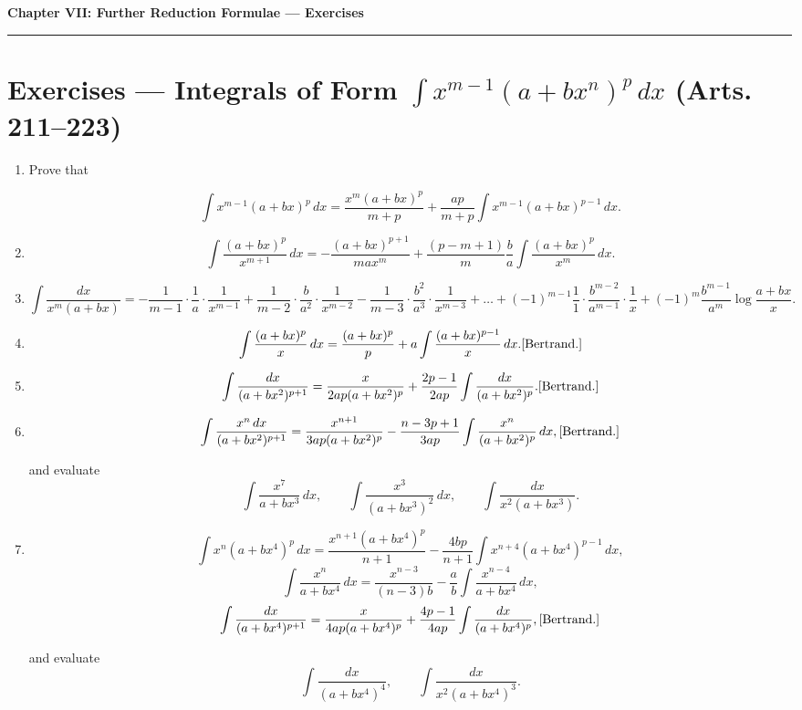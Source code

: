 \documentclass[11pt, a4paper]{article}
\newcommand{\source}[1]{\hfill\textnormal{[#1]}}
\begin{document}
\begin{center}
    {\LARGE \bfseries \color{accent} Chapter VII: Further Reduction Formulae --- Exercises}\\
    \vspace{0.2cm}
    {\color{accent}\rule{0.55\linewidth}{0.8pt}}
\end{center}
\vspace{0.35cm}

\section*{Exercises --- Integrals of Form $\displaystyle\int x^{m-1}(a+bx^n)^p\,dx$ (Arts. 211--223)}

\begin{enumerate}[leftmargin=2em]

\item Prove that

\[
\int x^{m-1}(a+bx)^p\,dx=\dfrac{x^m(a+bx)^p}{m+p}+\dfrac{ap}{m+p}\int x^{m-1}(a+bx)^{p-1}\,dx.
\]

\item
\[
\int \dfrac{(a+bx)^p}{x^{m+1}}\,dx=-\dfrac{(a+bx)^{p+1}}{max^m}+\dfrac{(p-m+1)}{m}\dfrac{b}{a}\int \dfrac{(a+bx)^p}{x^m}\,dx.
\]

\item
\[
\int \dfrac{dx}{x^m(a+bx)}=-\dfrac{1}{m-1}\cdot\dfrac1a\cdot\dfrac{1}{x^{m-1}}+\dfrac{1}{m-2}\cdot\dfrac{b}{a^2}\cdot\dfrac{1}{x^{m-2}}-\dfrac{1}{m-3}\cdot\dfrac{b^2}{a^3}\cdot\dfrac{1}{x^{m-3}}
+\dots+(-1)^{m-1}\dfrac{1}{1}\cdot\dfrac{b^{m-2}}{a^{m-1}}\cdot\dfrac1x+(-1)^m\dfrac{b^{m-1}}{a^m}\log\dfrac{a+bx}{x}.
\]

\item
\[
\int \dfrac{(a+bx)^p}{x}\,dx=\dfrac{(a+bx)^p}{p}+a\int \dfrac{(a+bx)^{p-1}}{x}\,dx. \source{Bertrand.}
\]

\item
\[
\int \dfrac{dx}{(a+bx^2)^{p+1}}=\dfrac{x}{2ap(a+bx^2)^p}+\dfrac{2p-1}{2ap}\int \dfrac{dx}{(a+bx^2)^p}. \source{Bertrand.}
\]

\item
\[
\int \dfrac{x^n\,dx}{(a+bx^2)^{p+1}}=\dfrac{x^{n+1}}{3ap(a+bx^2)^p}-\dfrac{n-3p+1}{3ap}\int \dfrac{x^n}{(a+bx^2)^p}\,dx, \source{Bertrand.}
\]

and evaluate
\[
\int \dfrac{x^7}{a+bx^3}\,dx, \qquad \int \dfrac{x^3}{(a+bx^3)^2}\,dx, \qquad \int \dfrac{dx}{x^2(a+bx^3)}.
\]

\item
\[
\int x^n(a+bx^4)^p\,dx=\dfrac{x^{n+1}(a+bx^4)^p}{n+1}-\dfrac{4bp}{n+1}\int x^{n+4}(a+bx^4)^{p-1}\,dx,
\]
\[
\int \dfrac{x^n}{a+bx^4}\,dx=\dfrac{x^{n-3}}{(n-3)b}-\dfrac{a}{b}\int \dfrac{x^{n-4}}{a+bx^4}\,dx,
\]
\[
\int \dfrac{dx}{(a+bx^4)^{p+1}}=\dfrac{x}{4ap(a+bx^4)^p}+\dfrac{4p-1}{4ap}\int \dfrac{dx}{(a+bx^4)^p}, \source{Bertrand.}
\]

and evaluate
\[
\int \dfrac{dx}{(a+bx^4)^4}, \qquad \int \dfrac{dx}{x^2(a+bx^4)^3}.
\]

\end{enumerate}
\end{document}
